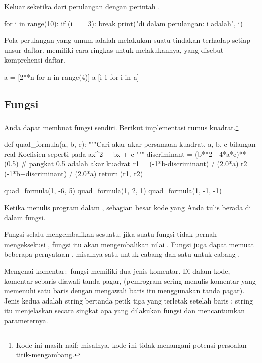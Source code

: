 Keluar seketika dari perulangan dengan perintah .
\begin{pythonconsole}
for i in range(10):
    if (i == 3):
        break
    print("di dalam perulangan: i adalah", i)
        
\end{pythonconsole}

Pola perulangan yang umum adalah melakukan suatu tindakan
terhadap setiap unsur daftar.
\python{} memiliki cara ringkas untuk melakukannya, yang disebut komprehensi daftar.
\begin{pythonconsole}
a = [2**n for n in range(4)]
a
[i-1 for i in a]
\end{pythonconsole}



\subsection{Fungsi}
Anda dapat membuat fungsi sendiri.
Berikut implementasi rumus kuadrat.\footnote{%
  Kode ini masih naif; misalnya, kode ini tidak menangani
  potensi persoalan titik-mengambang.}
\begin{pythonconsole}
def quad_formula(a, b, c):
    """Cari akar-akar persamaan kuadrat. 
      a, b, c  bilangan real  Koefisien seperti pada ax^2 + bx + c
    """
    discriminant = (b**2 - 4*a*c)**(0.5)  # pangkat 0.5 adalah akar kuadrat
    r1 = (-1*b-discriminant) / (2.0*a)
    r2 = (-1*b+discriminant) / (2.0*a)
    return (r1, r2)

quad_formula(1, -6, 5)
quad_formula(1, 2, 1)
quad_formula(1, -1, -1)
\end{pythonconsole}
Ketika menulis program dalam \python{}, sebagian besar kode yang Anda tulis
berada di dalam fungsi. 

Fungsi selalu mengembalikan sesuatu; 
jika suatu fungsi tidak pernah mengeksekusi , fungsi itu akan
mengembalikan nilai .
Fungsi juga dapat memuat beberapa pernyataan , misalnya 
satu untuk cabang  dan satu untuk cabang .

Mengenai komentar:~fungsi  memiliki dua jenis 
komentar.
Di dalam kode, komentar sebaris diawali tanda pagar, \inlinecode{\#}
(pemrogram sering menulis komentar yang memenuhi satu baris dengan mengawali 
baris itu menggunakan tanda pagar). 
Jenis kedua adalah string bertanda petik tiga yang terletak
setelah baris ; string itu
menjelaskan secara singkat
apa yang dilakukan fungsi dan mencantumkan parameternya.

